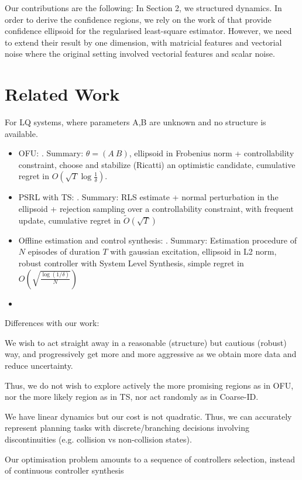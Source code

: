 \documentclass{article}
\begin{document}
Our contributions are the following:
In Section 2, we structured dynamics. In order to derive the confidence regions, we rely on the work of \citet{Abbasi2011} that provide confidence ellipsoid for the regularised least-square estimator. However, we need to extend their result by one dimension, with matricial features and vectorial noise where the original setting involved vectorial features and scalar noise.


\section{Related Work}

For LQ systems, where parameters A,B are unknown and no structure is available.
\begin{itemize}
    \item OFU: \citep{abbasi-yadkori11a}. Summary: $\theta=(A~B)$, ellipsoid in Frobenius norm + controllability constraint, choose and stabilize (Ricatti) an optimistic candidate, cumulative regret in $O(\sqrt{T}\log\frac{1}{\delta})$.
    \item PSRL with TS: \citep{abeille18a}. Summary: RLS estimate + normal perturbation in the ellipsoid + rejection sampling over a controllability constraint, with frequent update, cumulative regret in $\tilde{O}(\sqrt{T})$
    \item Offline estimation and control synthesis: \citep{Dean2017}. Summary: Estimation procedure of $N$ episodes of duration $T$ with gaussian excitation, ellipsoid in L2 norm, robust controller with System Level Synthesis, simple regret in $O(\sqrt{\frac{\log(1/\delta)}{N}})$
    \item \citep{Dean2018}
\end{itemize}

Differences with our work:
    
    We wish to act straight away in a reasonable (structure) but cautious (robust) way, and progressively get more and more aggressive as we obtain more data and reduce uncertainty.
    
    Thus, we do not wish to explore actively the more promising regions as in OFU, nor the more likely region as in TS, nor act randomly as in Coarse-ID.
    
    We have linear dynamics but our cost is not quadratic. Thus, we can accurately represent planning tasks with discrete/branching decisions involving discontinuities (e.g. collision vs non-collision states).
    
    Our optimisation problem amounts to a sequence of controllers selection, instead of continuous controller synthesis
\end{document}
